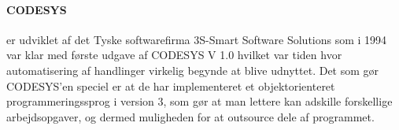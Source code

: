 \paragraph{CODESYS}
er udviklet af det Tyske softwarefirma 3S-Smart Software Solutions som i 1994 var klar med første udgave af CODESYS V 1.0 hvilket var tiden hvor automatisering af handlinger virkelig begynde at blive udnyttet. Det som gør CODESYS’en speciel er at de har implementeret et objektorienteret  programmeringssprog i version 3, som gør at man lettere kan adskille forskellige arbejdsopgaver, og dermed muligheden for at outsource dele af programmet.






